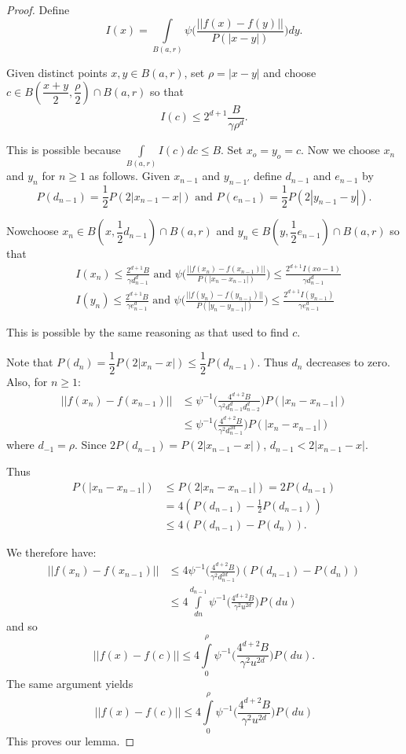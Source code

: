 \begin{proof}
Define
$$
I(x) =\int\limits_{B(a,r)} \psi \Bigg( \frac{|| f(x) -f(y)||}{P(|x-y|)}
\Bigg)  dy . 
$$

Given distinct points $x,y \in B(a,r)$, set $\rho = |x-y|$ and choose
$ c \in B( \dfrac{x+y}{2}, \dfrac{\rho}{2}) \cap B(a,r)$ so that  
$$
I(c) \leq 2^{d+1} \frac{B}{\gamma \rho^d}.
$$

This is possible because $\int \limits_{B(a,r)} I(c)dc \leq B$. Set
$x_o = y_o =c$. Now we choose $x_n$ and $y_n$ for $n \geq 1$ as
follows. Given $x_{n-1} $ and $y_{n-1'}$ define $d_{n-1}$ and
$e_{n-1}$ by  
$$
P(d_{n-1}) = \frac{1}{2} P(2|x_{n-1}-x|) \text{ and } P(e_{n-1}) =
\frac{1}{2} P(2|y_{n-1}-y|). 
$$

Now\pageoriginale choose $x_n \in B(x,\dfrac{1}{2} d_{n-1}) \cap
B(a,r)$ and $y_n \in B(y, \dfrac{1}{2} e_{n-1}) \cap B(a,r)$ so that   
\begin{align*}
& I(x_n)  \leq \frac{2^{d+1}B}{\gamma d^d_{n-1}} \text{ and } \psi \Bigg(
  \frac{||f(x_n) -f(x_{n-1})||}{P(|x_n - x_{n-1}|)} \Bigg) \leq
  \frac{2^{d+1} I(xo-1)}{\gamma d^d_{n-1}}\\ 
& I(y_n)  \leq \frac{2^{d+1}B}{\gamma e^d_{n-1}} \text{ and } \psi
  \Bigg( \frac{||f(y_n) -f(y_{n-1})||}{P(|y_n - y_{n-1}|)} \Bigg) \leq
  \frac{2^{d+1} I(y_{n-1})}{\gamma e^d_{n-1}} 
\end{align*}

This is possible by the same reasoning as that used to find $c$. 

Note that $P(d_n)= \dfrac{1}{2}P(2|x_n-x|) \leq
\dfrac{1}{2}P(d_{n-1})$. Thus $d_n$ decreases to zero. Also, for $n
\geq 1$: 
\begin{align*}
||f(x_n)-f(x_{n-1})|| & \leq \psi^{-1} \Bigg( \frac{ 4^{d+2}
    B}{\gamma^2 d^d_{n-1} d^d_{n-2}} \Bigg) P(|x_n-x_{n-1}|)\\ 
 & \leq \psi^{-1} \Bigg( \frac{ 4^{d+2} B}{\gamma^2 d^{2d}_{n-1} } \Bigg)
P(|x_n - x_{n-1}|) 
\end{align*}
where $d_{-1} = \rho$. Since $2P(d_{n-1}) = P(2|x_{n-1}-x|)$, 
$d_{n-1} < 2|x_{n-1}-x|$. 

Thus
\begin{align*}
P(|x_n-x_{n-1}|) & \leq P(2|x_n-x_{n-1}|) = 2P(d_{n-1})\\
& = 4(P(d_{n-1}) - \frac{1}{2}P(d_{n-1}))\\
& \leq 4(P(d_{n-1}) - P(d_{n})).
\end{align*}

We therefore have:
\begin{align*} 
||f(x_n)-f(x_{n-1})|| & \leq 4 \psi^{-1} \Bigg( \frac{ 4^{d+2}
    B}{\gamma^2 d^{2d}_{n-1}} \Bigg) (P(d_{n-1})-P(d_n))\\ 
& \leq 4 \int\limits^{d_{n-1}}_{dn} \psi^{-1} \Bigg( \frac{ 4^{d+2}
    B}{\gamma^2 u^{2d} } \Bigg) P(du) 
\end{align*}
and so\pageoriginale 
$$
||f(x) - f(c) || \leq 4 \int\limits^{\rho}_{0} \psi^{-1} \Bigg(
\frac{ 4^{d+2} B}{\gamma^2 u^{2d} } \Bigg) P(du). 
$$
The same argument yields 
$$
||f(x) - f(c) || \leq 4 \int\limits^{\rho}_{0} \psi^{-1} \Bigg(
\frac{ 4^{d+2} B}{\gamma^2 u^{2d} } \Bigg) P(du) 
$$
This proves our lemma.
\end{proof}

